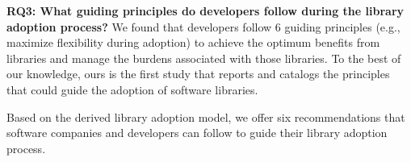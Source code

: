 \documentclass[sigconf,review,anonymous, table]{acmart}
\newcommand{\nd}{\vspace{1mm}\noindent}
\newcommand{\todo}[1]{{\color{red}{\textbf{#1}}}}
\newcounter{recommendation}[section]
\begin{document}
\nd\textbf{RQ3: What guiding principles do developers follow during the library adoption process?} We found that developers follow 6 guiding principles (e.g., maximize flexibility during adoption) to achieve the optimum benefits from libraries and manage the burdens associated with those libraries. To the best of our knowledge, ours is the first study that reports and catalogs the principles that could guide the adoption of software libraries.

Based on the derived library adoption model, we offer six recommendations that software companies and developers can follow to guide their library adoption process. 



\end{document}
